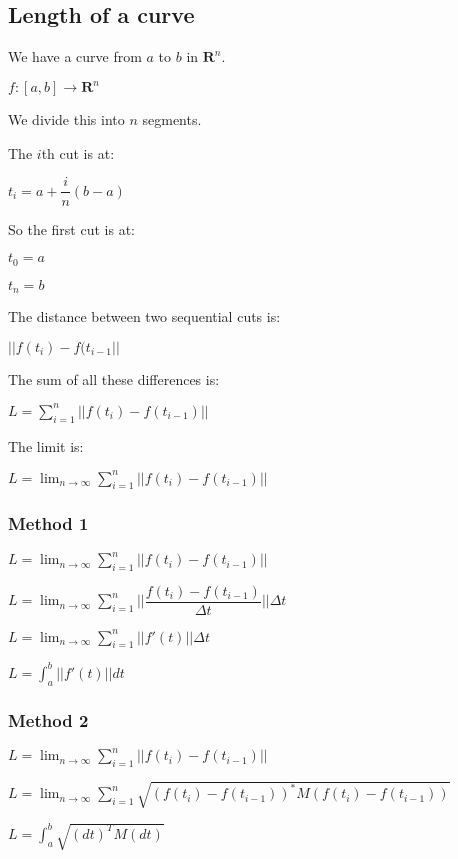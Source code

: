 
\subsection{Length of a curve}

We have a curve from \(a\) to \(b\) in \(\mathbf R^n\).

\(f:[a,b]\rightarrow \mathbf R^n\)

We divide this into \(n\) segments.

The \(i\)th cut is at:

\(t_i=a+\dfrac{i}{n}(b-a)\)

So the first cut is at:

\(t_0=a\)

\(t_n=b\)

The distance between two sequential cuts is:

\(||f(t_i)-f(t_{i-1}||\)

The sum of all these differences is:

\(L=\sum_{i=1}^n ||f(t_{i})-f(t_{i-1})||\)

The limit is:

\(L=\lim_{n\rightarrow \infty }\sum_{i=1}^n ||f(t_{i})-f(t_{i-1})||\)
\subsubsection{Method 1}

\(L=\lim_{n\rightarrow \infty }\sum_{i=1}^n ||f(t_{i})-f(t_{i-1})||\)

\(L=\lim_{n\rightarrow \infty }\sum_{i=1}^n ||\dfrac{f(t_{i})-f(t_{i-1})}{\Delta t}||\Delta t\)

\(L=\lim_{n\rightarrow \infty }\sum_{i=1}^n ||f'(t)||\Delta t\)

\(L=\int_a^b ||f'(t)||dt\)

\subsubsection{Method 2}

\(L=\lim_{n\rightarrow \infty }\sum_{i=1}^n ||f(t_{i})-f(t_{i-1})||\)

\(L=\lim_{n\rightarrow \infty }\sum_{i=1}^n \sqrt {(f(t_{i})-f(t_{i-1}))^*M(f(t_{i})-f(t_{i-1}))}\)

\(L=\int_a^b \sqrt {(dt)^TM(dt)}\)

